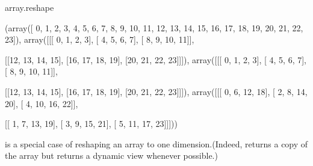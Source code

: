 \documentclass[letterpaper,10pt,english]{sphinxmanual}
\begin{document}
\begin{sphinxVerbatim}[commandchars=\\\{\}]
  
array.reshape
       
      
   
\end{sphinxVerbatim}

\begin{sphinxVerbatim}[commandchars=\\\{\}]
(array([ 0,  1,  2,  3,  4,  5,  6,  7,  8,  9, 10, 11, 12, 13, 14, 15, 16,
        17, 18, 19, 20, 21, 22, 23]),
 array([[[ 0,  1,  2,  3],
         [ 4,  5,  6,  7],
         [ 8,  9, 10, 11]],
 
        [[12, 13, 14, 15],
         [16, 17, 18, 19],
         [20, 21, 22, 23]]]),
 array([[[ 0,  1,  2,  3],
         [ 4,  5,  6,  7],
         [ 8,  9, 10, 11]],
 
        [[12, 13, 14, 15],
         [16, 17, 18, 19],
         [20, 21, 22, 23]]]),
 array([[[ 0,  6, 12, 18],
         [ 2,  8, 14, 20],
         [ 4, 10, 16, 22]],
 
        [[ 1,  7, 13, 19],
         [ 3,  9, 15, 21],
         [ 5, 11, 17, 23]]]))
\end{sphinxVerbatim}

 is a special case of reshaping an array to one dimension.(Indeed,  returns a copy of the array but  returns a dynamic view whenever possible.)

\begin{sphinxVerbatim}[commandchars=\\\{\}]
  
   
\end{sphinxVerbatim}
\end{document}
